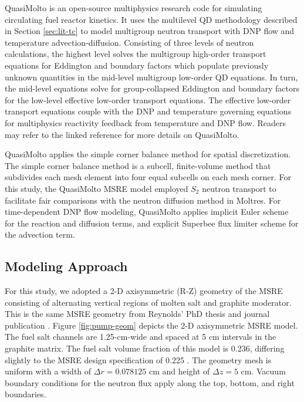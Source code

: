 QuasiMolto \cite{reynolds_analysis_2023} is an open-source multiphysics research code for
simulating circulating fuel reactor kinetics. It uses the multilevel \gls{QD} methodology described
in Section \ref{sec:lit-tc} to model multigroup neutron transport with \gls{DNP} flow and
temperature advection-diffusion. Consisting of three levels of neutron calculations, the highest
level solves the multigroup high-order transport equations for Eddington and boundary factors which
populate previously unknown quantities in the mid-level multigroup low-order \gls{QD} equations.
In turn, the mid-level equations solve for group-collapsed Eddington and boundary factors for the
low-level effective low-order transport equations. The effective low-order transport equations
couple with the \gls{DNP} and temperature governing equations for multiphysics reactivity feedback
from temperature and \gls{DNP} flow. Readers may refer to the linked reference
\cite{reynolds_analysis_2023} for more details on QuasiMolto.

QuasiMolto applies the simple corner balance method \cite{adams_subcell_1997} for spatial
discretization. The simple corner balance method is a subcell, finite-volume method that subdivides
each mesh element into four equal subcells on each mesh corner.
For this study, the QuasiMolto \gls{MSRE} model employed $S_2$ neutron transport to facilitate
fair comparisons with the neutron diffusion method in Moltres. For time-dependent \gls{DNP} flow
modeling, QuasiMolto applies implicit Euler scheme for the reaction
and diffusion terms, and explicit Superbee flux limiter scheme for the advection term.

\subsection{Modeling Approach}

For this study, we adopted a 2-D axisymmetric (R-Z) geometry of the \gls{MSRE} consisting of
alternating vertical regions of molten salt and graphite moderator. This is the same \gls{MSRE}
geometry from Reynolds' PhD thesis \cite{reynolds_multilevel_2020} and
journal publication \cite{reynolds_analysis_2023}. Figure \ref{fig:pump-geom} depicts the 2-D
axisymmetric \gls{MSRE} model. The fuel salt channels are 1.25-cm-wide and spaced at 5 cm intervals
in the graphite matrix. The fuel salt volume fraction of this model is 0.236, differing
slightly to the \gls{MSRE} design specification of 0.225 \cite{robertson_msre_1965}. The geometry
mesh is uniform with a width of $\Delta r=0.078125$ cm and height of $\Delta z=5$ cm.
Vacuum boundary conditions for the neutron flux apply along the top, bottom, and right boundaries.

